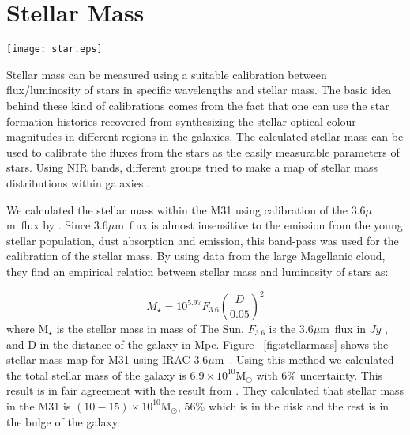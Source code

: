 \documentclass[useAMS,usenatbib]{mn2e}
\newcommand \um    {$\mu$m\ }
\begin{document}
\section{Stellar Mass}
\label{sec:starmass}
\begin{figure*}
\centering
\texttt{[image: star.eps]}
\caption{Stellar Mass surface density. This mass is produced using $IRAC$ 3.6 $\mu$ m data and its calibration presented in equation ~\ref{equ:eskew}}
\label{fig:stellarmass}
\end{figure*}

Stellar mass can be measured using a suitable calibration between flux/luminosity of stars in specific wavelengths and stellar mass. The basic idea behind these kind of calibrations comes from the fact that one can use the star formation histories recovered from synthesizing the stellar optical colour magnitudes in different regions in the galaxies. The calculated stellar mass can be used  to calibrate the fluxes from the stars as the easily measurable parameters of stars. Using NIR bands, different groups tried to make a map of stellar mass distributions within galaxies \citep[e.g.,][]{Elmgreen84}.%

We calculated the stellar mass within the M31 using calibration of the 3.6\um flux by \cite{Eskew12}.  Since 3.6\um flux is almost insensitive to the emission from the young stellar population, dust absorption and emission, this band-pass was used for the calibration of the stellar mass. By using data from the large Magellanic cloud, they find an empirical relation between stellar mass and luminosity of stars as:

\begin{equation}
\label{equ:eskew}
M _{\star}= 10^{5.97} F_{3.6}(\frac{D}{0.05})^2
\end{equation}
where M$_{\star}$ is the stellar mass in mass of The Sun, $F_{3.6}$ is the 3.6\um flux in $Jy$ , and D in the distance of the galaxy in Mpc. Figure ~\ref{fig:stellarmass} shows the stellar mass map for M31 using IRAC 3.6\um. Using this method we calculated the total stellar mass of the galaxy is $6.9 \times 10^{10}$M$_{\odot}$ with 6$\%$ uncertainty. This result is in fair agreement with the result from \cite{Tamm12}. They calculated that stellar mass in the M31 is $(10-15) \times 10^{10}$M$_{\odot}$, 56$\%$ which is in the disk and the rest is in the bulge of the galaxy.   %
\end{document}
